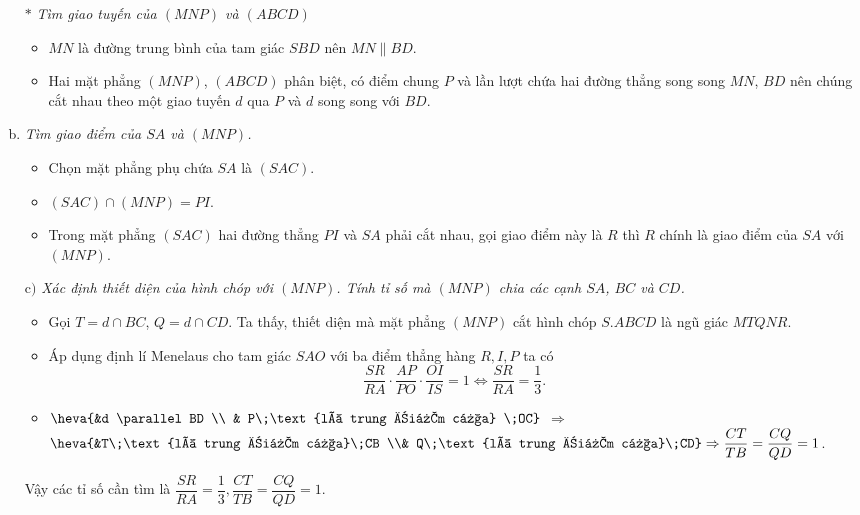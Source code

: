 \begin{bt}
{{\begin{tikzpicture}[scale=1, font=\footnotesize, line join=round, line cap=round, >=stealth]
		\end{tikzpicture}}
		\begin{enumerate}[b)]
			\item[$*$] \textit{Tìm giao tuyến của  $(MNP)$ và $(ABCD)$}
			\begin{itemize}
				\item $MN$ là đường trung bình của tam giác $SBD$ nên $MN \parallel BD$.
				\item Hai mặt phẳng $(MNP)$, $(ABCD)$ phân biệt, có điểm chung $P$ và lần lượt chứa hai đường thẳng song song $MN$, $BD$ nên chúng cắt nhau theo một giao tuyến $d$ qua $P$ và $d$ song song với $BD$.
			\end{itemize}
			\item \textit{ Tìm giao điểm của $SA$ và $(MNP)$.}
			\begin{itemize}
				\item  Chọn mặt phẳng phụ chứa $SA$ là $(SAC)$.
				\item $(SAC)\cap (MNP)=PI$.
				\item Trong mặt phẳng $(SAC)$ hai đường thẳng $PI$ và $SA$ phải cắt nhau, gọi giao điểm này là $R$ thì $R$ chính là giao điểm của $SA$ với $(MNP)$.
			\end{itemize}
			\item[$\text{c})$]  \textit{Xác định thiết diện của hình chóp với $(MNP)$. Tính tỉ số mà $(MNP)$ chia các cạnh $SA$, $BC$ và $CD$.}
			\begin{itemize}
				\item  Gọi $T=d\cap BC$, $Q=d\cap CD$. Ta thấy, thiết diện mà mặt phẳng $(MNP)$ cắt hình chóp $S.ABCD$ là ngũ giác $MTQNR$.
				\item 	Áp dụng định lí Menelaus cho tam giác $SAO$ với ba điểm thẳng hàng $R, I, P$ ta có
				$$\dfrac{SR}{RA}\cdot\dfrac{AP}{PO}\cdot\dfrac{OI}{IS}=1\Leftrightarrow \dfrac{SR}{RA}=\dfrac{1}{3}.$$
				\item $\heva{&d \parallel BD \\
					& P\;\text{là trung điểm của} \;OC}$ $\Rightarrow$ $\heva{&T\;\text{là trung điểm của}\;CB \\& Q\;\text{là trung điểm của}\;CD}\Rightarrow \dfrac{CT}{TB}=\dfrac{CQ}{QD}=1$.
			\end{itemize}
			Vậy các tỉ số cần tìm là  $\dfrac{SR}{RA}=\dfrac{1}{3}, \dfrac{CT}{TB}=\dfrac{CQ}{QD}=1.$
	\end{enumerate}}
\end{bt}

